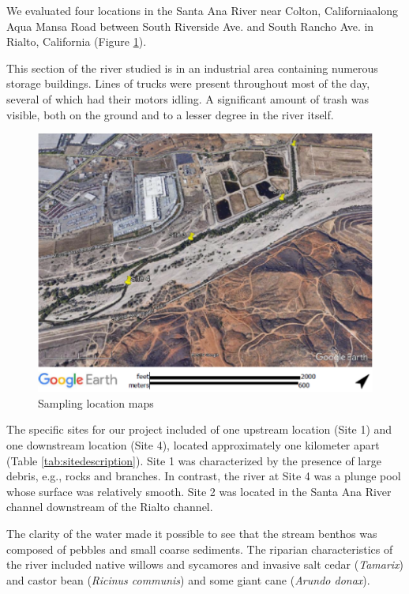 \documentclass{article}\usepackage[]{graphicx}\usepackage[]{color}
\begin{document}
We evaluated four locations in the Santa Ana River near Colton, Californiaalong Aqua Mansa Road between South Riverside Ave. and South Rancho Ave. in Rialto, California (Figure \ref{SAR_Image}). 

This section of the river studied is in an industrial area containing numerous storage buildings. Lines of trucks were present throughout most of the day, several of which had their motors idling.  A significant amount of trash was visible, both on the ground and to a lesser degree in the river itself. 

\begin{figure}[!ht]
\includegraphics[width=1.00\textwidth]{Figures/SiteMap}
\caption{Sampling location maps}
\label{SAR_Image}
\end{figure}

The specific sites for our project included of one upstream location (Site 1) and one downstream location (Site 4), located approximately one kilometer apart (Table \ref{tab:sitedescription}). Site 1 was characterized by the presence of large debris, e.g., rocks and branches. In contrast, the river at Site 4 was a plunge pool whose surface was relatively smooth. Site 2 was located in the Santa Ana River channel downstream of the Rialto channel. 

The clarity of the water made it possible to see that the stream benthos was composed of pebbles and small coarse sediments. The riparian characteristics of the river included native willows and sycamores and invasive  salt cedar (\emph{Tamarix}) and castor bean (\emph{Ricinus communis})  and some giant cane (\emph{Arundo donax}). 
\end{document}
